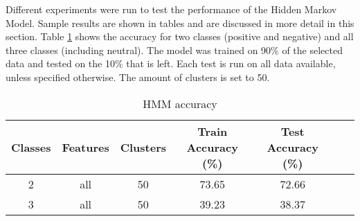 
\begin{comment}
Experiments / Empirical evaluation (roughly 2-3 pages)
• Any details about experiments (dataset sizes, parameter selection, etc)
• Results
• Analysis (discussion of results / visualization / findings / etc)
\end{comment}

Different experiments were run to test the performance of the Hidden Markov Model. Sample results are shown in tables and are discussed in more detail in this section. Table \ref{table:HMMaccuracy} shows the accuracy for two classes (positive and negative) and all three classes (including neutral). The model was trained on 90\% of the selected data and tested on the 10\% that is left. Each test is run on all data available, unless specified otherwise. The amount of clusters is set to 50.

\begin{table}[h!]
\begin{center}
\begin{tabular}{| c | c | c | c | c | c | c |}
\hline
 {\textbf{Classes}} 			& {\textbf{Features}}	& {\textbf{Clusters}} 
 & {\textbf{Train Accuracy (\%)}} 					& {\textbf{Test Accuracy (\%)}} 
 \\
\hline
2 			& all 	& 50			& 73.65		& 72.66 		\\ %
3 			& all	& 50			& 39.23		& 38.37 		\\
\hline
\end{tabular}
\caption{HMM accuracy}
\label{table:HMMaccuracy}
\end{center}
\end{table}

\begin{comment}
\begin{table}[h!]
\begin{center}
\begin{tabular}{| c | c | c | c | c | c |}
\hline
 {\textbf{Classes}} 	
 & {\textbf{Data per class}} 					& {\textbf{Clusters}} 
 & {\textbf{Train Accuracy (\%)}} 					& {\textbf{Test Accuracy (\%)}} 
 \\
\hline
2 			& 500 		& 50			& 73.65		& 72.66 		\\ %
3 			& 500 		& 50			& 39.23		& 38.37 		\\
\hline
\end{tabular}
\caption{HMM accuracy}
\label{table:HMMaccuracy}
\end{center}
\end{table}
\end{comment}

